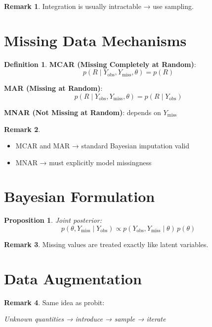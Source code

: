 \documentclass[12pt,oneside]{book}
\numberwithin{equation}{section}
\theoremstyle{definition}
\newtheorem{definition}{Definition}[section]
\newtheorem{remark}{Remark}[section]
\theoremstyle{plain}
\newtheorem{proposition}{Proposition}[section]
\theoremstyle{remark}
\begin{document}
\begin{remark}
Integration is usually intractable → use sampling.
\end{remark}

\section{Missing Data Mechanisms}

\begin{definition}
\textbf{MCAR (Missing Completely at Random)}:
$$
p(R \mid Y_{\text{obs}}, Y_{\text{miss}}, \theta)
=
p(R)
$$

\textbf{MAR (Missing at Random)}:
$$
p(R \mid Y_{\text{obs}}, Y_{\text{miss}}, \theta)
=
p(R \mid Y_{\text{obs}})
$$

\textbf{MNAR (Not Missing at Random)}:
depends on $Y_{\text{miss}}$
\end{definition}

\begin{remark}
\begin{itemize}
\item MCAR and MAR → standard Bayesian imputation valid
\item MNAR → must explicitly model missingness
\end{itemize}
\end{remark}

\section{Bayesian Formulation}

\begin{proposition}
Joint posterior:
$$
p(\theta, Y_{\text{miss}} \mid Y_{\text{obs}})
\propto
p(Y_{\text{obs}}, Y_{\text{miss}} \mid \theta)\, p(\theta)
$$
\end{proposition}

\begin{remark}
Missing values are treated exactly like latent variables.
\end{remark}

\section{Data Augmentation}

\begin{remark}
Same idea as probit:

\begin{center}
\emph{Unknown quantities → introduce → sample → iterate}
\end{center}
\end{remark}
\end{document}
